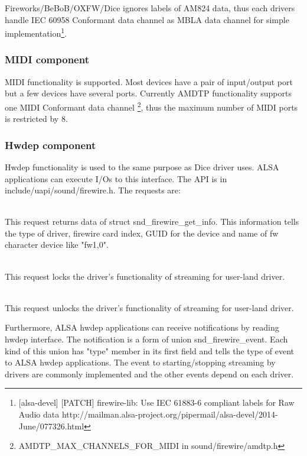 \documentclass[onecolumn]{article}
\begin{document}
Fireworks/BeBoB/OXFW/Dice ignores labels of AM824 data, thus each drivers handle IEC 60958 Conformant data channel as MBLA data channel for simple implementation\footnote{[alsa-devel] [PATCH] firewire-lib: Use IEC 61883-6 compliant labels for Raw Audio data http://mailman.alsa-project.org/pipermail/alsa-devel/2014-June/077326.html}.

\subsubsection{MIDI component}

MIDI functionality is supported. Most devices have a pair of input/output port but a few devices have several ports. Currently AMDTP functionality supports one MIDI Conformant data channel \footnote{AMDTP\_MAX\_CHANNELS\_FOR\_MIDI in sound/firewire/amdtp.h}, thus the maximum number of MIDI ports is restricted by 8.

\subsubsection{Hwdep component}
Hwdep functionality is used to the same purpose as Dice driver uses. ALSA applications can execute I/Os to this interface. The API is in include/uapi/sound/firewire.h. The requests are:

\begin{description}
\small
\item [SNDRV\_FIREWIRE\_IOCTL\_GET\_INFO] \mbox{} \\
This request returns data of struct snd\_firewire\_get\_info. This information tells the type of driver, firewire card index, GUID for the device and name of fw character device like "fw1,0".
\item [SNDRV\_FIREWIRE\_IOCTL\_LOCK] \mbox{} \\
This request locks the driver's functionality of streaming for user-land driver.
\item [SNDRV\_FIREWIRE\_IOCTL\_UNLOCK] \mbox{} \\
This request unlocks the driver's functionality of streaming for user-land driver.
\end{description}

Furthermore, ALSA hwdep applications can receive notifications by reading hwdep interface. The notification is a form of union snd\_firewire\_event. Each kind of this union has "type" member in its first field and tells the type of event to ALSA hwdep applications. The event to starting/stopping streaming by drivers are commonly implemented and the other events depend on each driver.
\end{document}
